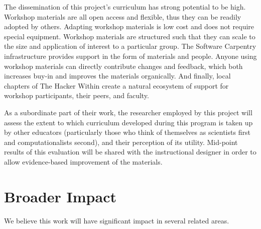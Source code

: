 \documentclass[11pt]{article}
\begin{document}
The dissemination of this project's curriculum has strong potential to be high. Workshop materials are all open access and flexible, thus they can be readily adopted by others. Adapting workshop materials is low cost and does not require special equipment. Workshop materials are structured such that they can scale to the size and application of interest to a particular group. The Software Carpentry infrastructure provides support in the form of materials and people. Anyone using workshop materials can directly contribute changes and feedback, which both increases buy-in and improves the materials organically. And finally, local chapters of The Hacker Within create a natural ecosystem of support for workshop participants, their peers, and faculty. 

As a subordinate part of their work, the researcher employed by this
project will assess the extent to which curriculum developed during
this program is taken up by other educators (particularly those who
think of themselves as scientists first and computationalists second),
and their perception of its utility.  Mid-point results of this
evaluation will be shared with the instructional designer in order to
allow evidence-based improvement of the materials.

\section{Broader Impact}

We believe this work will have significant impact in several related
areas.
\end{document}
